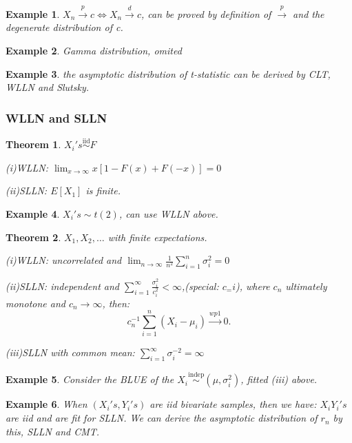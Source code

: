 \documentclass{ctexart}
\newtheorem{theorem}{Theorem}[subsection]
\newtheorem{example}{Example}[subsection]
\begin{document}
\begin{example}
\(X_n \xrightarrow{p}c \iff X_n \xrightarrow{d}c\), can be proved by definition of \(\xrightarrow{p}\) and the degenerate distribution of c.  
\end{example}

\begin{example}
  Gamma distribution, omited
\end{example}
\begin{example}
  the asymptotic distribution of t-statistic can be derived by CLT, WLLN and Slutsky. 
\end{example}
\subsubsection{WLLN and SLLN}
\begin{theorem}
  \(X_i's \overset{\text{iid}}{\sim}F\)
  
  (i)WLLN: \(\lim_{x \to \infty}x[1-F(x)+F(-x)]=0\) 
  
  (ii)SLLN: \(E[X_1]\) is finite.  
\end{theorem}
\begin{example}
  \(X_i's \sim t(2)\), can use WLLN above.  
\end{example}
\begin{theorem}
  \(X_1,X_2,\ldots\) with finite expectations. 
  
  (i)WLLN: uncorrelated and \(\lim_{n\to \infty}\frac{1}{n^2}\sum_{i=1}^{n}\sigma_i^2=0\) 
  
  (ii)SLLN: independent and \(\sum_{i=1}^{\infty} \frac{\sigma_i^2}{c_i^2}<\infty\),(special: \(c_=i\)), where \(c_n\) ultimately monotone and \(c_n\to \infty\), then: 
  \[
  c_n ^{-1} \sum_{i=1}^{n} (X_i-\mu_i)\xrightarrow{wp1}0.
  \]    

  (iii)SLLN with common mean: \(\sum_{i=1}^{\infty} \sigma_i ^{-2}=\infty\) 
\end{theorem}
\begin{example}
  Consider the BLUE of the \(X_i \overset{\text{indep}}{\sim}(\mu,\sigma_i^2)\), fitted (iii) above.  
\end{example}
\begin{example}
  When \((X_i's,Y_i's)\) are iid bivariate samples, then we have: \(X_iY_i's\) are iid and are fit for SLLN. We can derive the asymptotic distribution of \(r_n\) by this, SLLN and CMT.   
\end{example}
\end{document}
